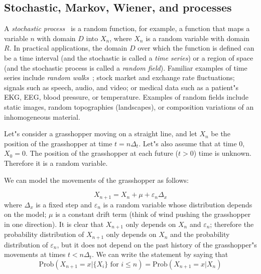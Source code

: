 \documentclass[justified, sixbynine]{tufte-book}
\theoremstyle{plain}%
\newtheorem * {corollary}{Corollary}
\theoremstyle{definition}
\theoremstyle{remark}
\newtheorem * {remark}{Remark}
\newtheorem * {note}{Note}
\begin{document}
\begin{fullwidth}
\goodbreak\section{Stochastic, Markov, Wiener, and processes}


A {\it stochastic process}~\cite{stochastic} is a random function, 
for example, a function that maps a
variable $n$ with domain $D$ into $X_n$, where $X_n$ is a random variable
with domain $R$. In practical applications, the domain $D$ over which the
function is defined can be a time interval (and the stochastic is called a
{\it time series}) or a region of space (and the stochastic process is
called a {\it random field}). Familiar examples of time series include {\it %
random walks}~\cite{rwalk}; stock market and exchange rate fluctuations; signals such as
speech, audio, and video; or medical data such as a patient"s EKG, EEG, blood
pressure, or temperature. Examples of random fields include static images, 
random topographies (landscapes), or composition variations of an
inhomogeneous material.

Let"s consider a grasshopper moving on a straight line, and let $X_n$ be the
position of the grasshopper at time $t=n\Delta _t$. Let"s also assume that at time 0, 
$X_0=0$. The position of the grasshopper at each future ($t>0$) time is unknown.
Therefore it is a random variable.

We can model the movements of the grasshopper as follows:

\begin{equation}
X_{n+1}=X_n + \mu + \varepsilon _n\Delta _x  \label{markov1}
\end{equation}
where $\Delta _x$ is a fixed step and $\varepsilon _n$ is a random variable
whose distribution depends on the model; $\mu$ is a constant drift term
(think of wind pushing the grasshopper in one direction).
It is clear that $X_{n+1}$ only
depends on $X_n$ and $\varepsilon _n$; therefore the probability distribution
of $X_{n+1}$ only depends on $X_n$ and the probability distribution of $%
\varepsilon _n$, but it does not depend on the past history of the grasshopper"s movements at
times $t<n\Delta _t$. We can write the statement by saying that
\begin{equation}
\textrm{Prob}(X_{n+1}=x|\{X_i\}\text{ for }i\leq n)=\textrm{Prob}(X_{n+1}=x|X_n)  \label{markov2}
\end{equation}


\end{fullwidth}
\end{document}
